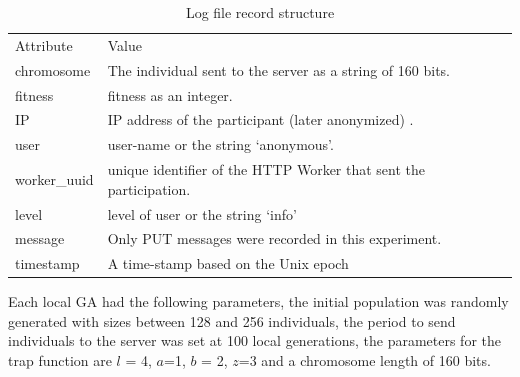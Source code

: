 \documentclass{llncs}
\begin{document}
\begin{table}[htbp]
  \small
  \caption{ Log file record structure}
  \label{tab:record} 
  \centering
  \small
  \begin{tabular}{l  l}
    \hline\noalign{\smallskip}
    Attribute & Value \\
    \noalign{\smallskip}\hline\noalign{\smallskip}
    chromosome   & The individual sent to the server as a string of 160 bits.  \\ \hline
    fitness & fitness as an integer.  \\ \hline
    IP & IP address of the participant (later anonymized) .\\ \hline
    user & user-name or the string `anonymous'.  \\ \hline
    worker\_uuid & unique identifier of the HTTP Worker that sent the participation.   \\ \hline
    level &  level of user or the string `info' \\ \hline
    message & Only PUT messages were recorded in this experiment. \\ \hline
    timestamp & A time-stamp based on the Unix epoch\\ \hline
  \end{tabular}
\end{table}

Each local GA had the following parameters, the initial population was randomly generated 
with sizes between 128 and 256 individuals, the period to send individuals to the server
was set at 100 local generations, the parameters for the trap function are $l$ = 4,
$a$=1, $b$ = 2, $z$=3 and a chromosome length of 160 bits.
\end{document}
